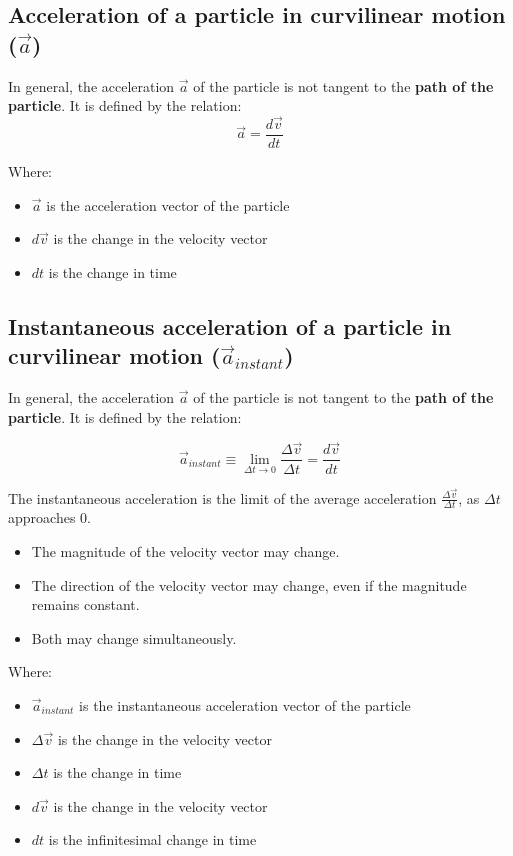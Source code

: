 \documentclass[11pt]{article}
\begin{document}
\subsection{Acceleration of a particle in curvilinear motion (\(\vec{a}\))}
\label{sec:orgfa3b5eb}
In general, the acceleration \(\vec{a}\) of the particle is not tangent to the \textbf{path of the particle}. It is defined by the relation:
\[\vec{a} = \frac{d \vec{v}}{dt}\]

Where:
\begin{itemize}
\item \(\vec{a}\) is the acceleration vector of the particle
\item \(d \vec{v}\) is the change in the velocity vector
\item \(dt\) is the change in time
\end{itemize}

\subsection{Instantaneous acceleration of a particle in curvilinear motion (\(\vec{a}_{instant}\))}
\label{sec:orga6dff96}
In general, the acceleration \(\vec{a}\) of the particle is not tangent to the \textbf{path of the particle}. It is defined by the relation:

\[\vec{a}_{instant} \equiv \lim_{\Delta t \rightarrow 0} \frac{\Delta \vec{v}}{\Delta t} = \frac{d \vec{v}}{dt}\]

The instantaneous acceleration is the limit of the average acceleration \(\frac{\Delta \vec{v}}{\Delta t}\), as \(\Delta t\) approaches 0.
\begin{itemize}
\item The magnitude of the velocity vector may change.
\item The direction of the velocity vector may change, even if the magnitude remains constant.
\item Both may change simultaneously.
\end{itemize}

Where:
\begin{itemize}
\item \(\vec{a}_{instant}\) is the instantaneous acceleration vector of the particle
\item \(\Delta \vec{v}\) is the change in the velocity vector
\item \(\Delta t\) is the change in time
\item \(d \vec{v}\) is the change in the velocity vector
\item \(dt\) is the infinitesimal change in time
\end{itemize}
\end{document}
